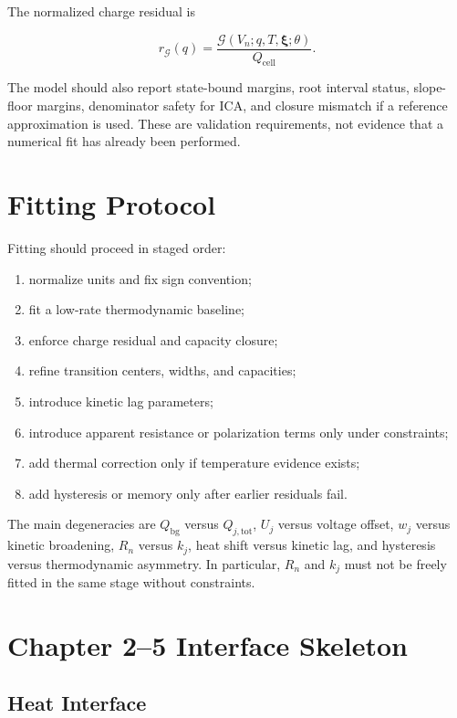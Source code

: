 \documentclass[11pt,a4paper]{article}
\newcommand{\cell}{\mathrm{cell}}
\newcommand{\bg}{\mathrm{bg}}
\newcommand{\tot}{\mathrm{tot}}
\begin{document}
The normalized charge residual is

\begin{equation}
r_{\mathcal{G}}(q)
=
\frac{\mathcal{G}(V_n;q,T,\bm{\xi};\theta)}{Q_{\cell}}.
\label{eq:charge_validation_residual}
\end{equation}

The model should also report state-bound margins, root interval status, slope-floor margins, denominator safety for ICA, and closure mismatch if a reference approximation is used. These are validation requirements, not evidence that a numerical fit has already been performed.

\section{Fitting Protocol}

Fitting should proceed in staged order:

\begin{enumerate}[label=\arabic*.]
\item normalize units and fix sign convention;
\item fit a low-rate thermodynamic baseline;
\item enforce charge residual and capacity closure;
\item refine transition centers, widths, and capacities;
\item introduce kinetic lag parameters;
\item introduce apparent resistance or polarization terms only under constraints;
\item add thermal correction only if temperature evidence exists;
\item add hysteresis or memory only after earlier residuals fail.
\end{enumerate}

The main degeneracies are \(Q_{\bg}\) versus \(Q_{j,\tot}\), \(U_j\) versus voltage offset, \(w_j\) versus kinetic broadening, \(R_n\) versus \(k_j\), heat shift versus kinetic lag, and hysteresis versus thermodynamic asymmetry. In particular, \(R_n\) and \(k_j\) must not be freely fitted in the same stage without constraints.

\section{Chapter 2--5 Interface Skeleton}

\subsection{Heat Interface}
\end{document}
